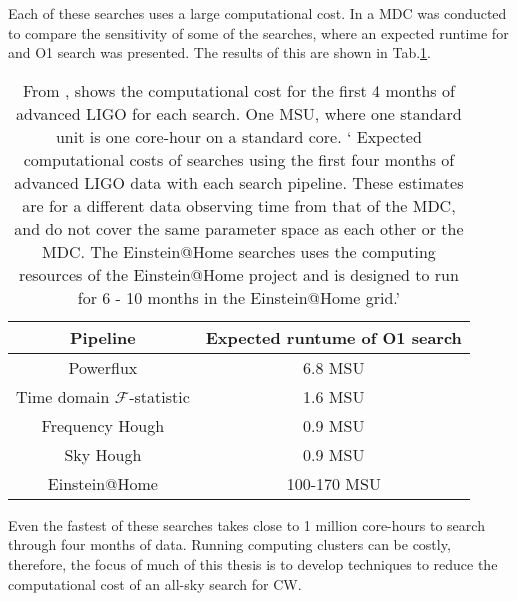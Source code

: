 Each of these searches uses a large computational cost. In \citep{walsh2016ComparisonMethods} a \ac{MDC} was conducted to compare the sensitivity of some of the searches, where an expected runtime for and O1 search was presented. 
The results of this are shown in Tab.\ref{searchcw:search:semi:cost}.
\begin{table}
	\centering
	\caption{From \citep{walsh2016ComparisonMethods}, shows the computational cost for the first 4 months of advanced \ac{LIGO} for each search. One \ac{MSU}, where one standard unit is one core-hour on a standard core. ` Expected computational costs of searches using the first four months of advanced \ac{LIGO} data with each search pipeline. These estimates are for a different data observing time from that of the \ac{MDC}, and do not cover the same parameter space as each other or the \ac{MDC}. The Einstein@Home searches uses the computing resources of the Einstein@Home project and is designed to run for 6 - 10 months in the Einstein@Home grid.'  \label{searchcw:search:semi:cost}}
	
	\bgroup
	\def\arraystretch{1.5}
	\centering
	\begin{tabular}{|c c|}
		\hline
		Pipeline & Expected runtume of O1 search \\
		\hline
		Powerflux & 6.8 MSU \\

		Time domain $\mathcal{F}$-statistic & 1.6 MSU\\

		Frequency Hough & 0.9 MSU \\

		Sky Hough & 0.9 MSU\\
		\hline
		Einstein@Home & 100-170 MSU\\
		\hline

	\end{tabular}
	\egroup
\end{table}
Even the fastest of these searches takes close to 1 million core-hours to search through four months of data.
Running computing clusters can be costly, therefore, the focus of much of this thesis is to develop techniques to reduce the computational cost of an all-sky search for \ac{CW}.

